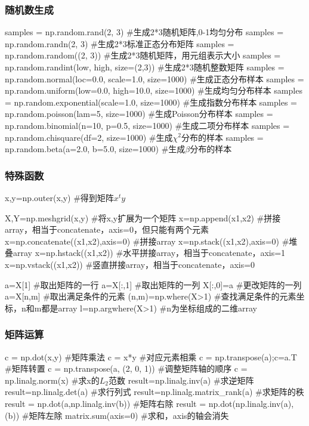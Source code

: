     \subsubsection{随机数生成}
      \begin{codeblock}[language=python, caption={ramdom sample}]
        samples = np.random.rand(2, 3) #生成2*3随机矩阵,0-1均匀分布
        samples = np.random.randn(2, 3) #生成2*3标准正态分布矩阵
        samples = np.random.random((2, 3)) #生成2*3随机矩阵，用元组表示大小
        samples = np.random.randint(low, high, size=(2,3)) #生成2*3随机整数矩阵
        samples = np.random.normal(loc=0.0, scale=1.0, size=1000) #生成正态分布样本
        samples = np.random.uniform(low=0.0, high=10.0, size=1000) #生成均匀分布样本
        samples = np.random.exponential(scale=1.0, size=1000) #生成指数分布样本
        samples = np.random.poisson(lam=5, size=1000) #生成Poisson分布样本
        samples = np.random.binomial(n=10, p=0.5, size=1000) #生成二项分布样本
        samples = np.random.chisquare(df=2, size=1000) #生成$\chi^2$分布的样本
        samples = np.random.beta(a=2.0, b=5.0, size=1000) #生成$\beta$分布的样本
      \end{codeblock}

    \subsubsection{特殊函数}  
      \begin{codeblock}[language=python, caption={Advanced operations in numpy}]
        x,y=np.outer(x,y) #得到矩阵$x^{t}y$

        X,Y=np.meshgrid(x,y) #将x,y扩展为一个矩阵
        x=np.append(x1,x2) #拼接array，相当于concatenate，axis=0，但只能有两个元素
        x=np.concatenate((x1,x2),axis=0) #拼接array
        x=np.stack((x1,x2),axis=0) #堆叠array
        x=np.hstack((x1,x2)) #水平拼接array，相当于concatenate，axis=1
        x=np.vstack((x1,x2)) #竖直拼接array，相当于concatenate，axis=0

        a=X[1] #取出矩阵的一行
        a=X[:,1] #取出矩阵的一列
        X[:,0]=a #更改矩阵的一列
        a=X[n,m] #取出满足条件的元素
        (n,m)=np.where(X>1) #查找满足条件的元素坐标，n和m都是array
        l=np.argwhere(X>1) #n为坐标组成的二维array
      \end{codeblock}

    \subsubsection{矩阵运算}
      \begin{codeblock}[language=python, caption={calculation of matrix}]
        c = np.dot(x,y) #矩阵乘法
        c = x*y #对应元素相乘
        c = np.transpose(a);c=a.T #矩阵转置
        c = np.transpose(a, (2, 0, 1)) #调整矩阵轴的顺序
        c = np.linalg.norm(x) #求x的$L_2$范数
        result=np.linalg.inv(a) #求逆矩阵
        result=np.linalg.det(a) #求行列式
        result=np.linalg.matrix_rank(a) #求矩阵的秩
        result = np.dot(a,np.linalg.inv(b)) #矩阵右除
        result = np.dot(np.linalg.inv(a),(b)) #矩阵左除
        matrix.sum(axis=0) #求和，axis的轴会消失
      \end{codeblock}

